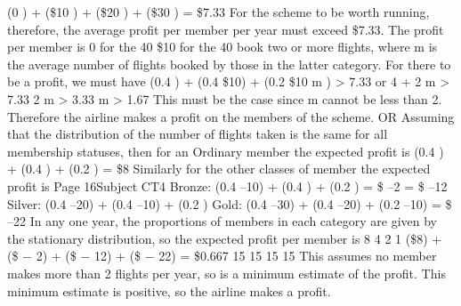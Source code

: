 (0 ) + (\$10 ) + (\$20 ) + (\$30 ) = \$7.33
For the scheme to be worth running, therefore, the average profit
per member per year must exceed \$7.33.
The profit per member is 0 for the 40%
\$10 for the 40%
book two or more flights, where m is the average number of flights
booked by those in the latter category.
For there to be a profit, we must have
(0.4 ) + (0.4 \times \$10) + (0.2 \times \$10 m ) > 7.33
or
4 + 2 m > 7.33
2 m > 3.33
m > 1.67
This must be the case since m cannot be less than 2.
Therefore the airline makes a profit on the members of the scheme.
OR
Assuming that the distribution of the number of flights taken
is the same for all membership statuses, then for an Ordinary
member the expected profit is
(0.4 ) + (0.4 ) + (0.2 ) = \$8
Similarly for the other classes of member the expected profit
is
Page 16Subject CT4 %
Bronze: (0.4 \times –10) + (0.4 ) + (0.2 )
= \$ –2
= \$ –12
Silver: (0.4 \times –20) + (0.4 \times –10) + (0.2 )
Gold:
(0.4 \times –30) + (0.4 \times –20) + (0.2 \times –10) = \$ –22
In any one year, the proportions of members in each category
are given by the stationary distribution,
so the expected profit per member is
8
4
2
1
(\$8) + (\$ − 2) + (\$ − 12) + (\$ − 22) = \$0.667
15
15
15
15
This assumes no member makes more than 2 flights per year, so
is a minimum estimate of the profit.
This minimum estimate is positive, so the airline makes a profit.
